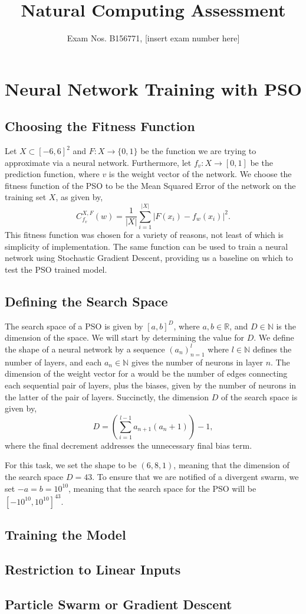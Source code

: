 \documentclass[12pt]{article}
\title{Natural Computing Assessment}
\author{Exam Nos. B156771, [insert exam number here]}
\begin{document}
\maketitle

\section{Neural Network Training with PSO}
\subsection{Choosing the Fitness Function}
Let $X \subset [-6,6]^2$ and $F:X\rightarrow \{0,1\}$ be the function we are trying to approximate via a neural network.
Furthermore, let $f_v:X\rightarrow [0,1]$ be the prediction function, where $v$ is the weight vector of the network.
We choose the fitness function of the PSO to be the Mean Squared Error of the network on the training set $X$, as given by,
\begin{equation}
    C_{f_v}^{X, F}(w) = \frac{1}{\left|X\right|}\sum_{i=1}^{\left|X\right|}\left|F(x_i) - f_w(x_i)\right|^2.
\end{equation}
This fitness function was chosen for a variety of reasons, not least of which is simplicity of implementation. 
The same function can be used to train a neural network using Stochastic Gradient Descent, providing us a baseline on which to test the PSO trained model. 
\subsection{Defining the Search Space}
The search space of a PSO is given by $[a,b]^D$, where $a,b\in \mathbb{R}$, and $D\in\mathbb{N}$ is the dimension of the space. 
We will start by determining the value for $D$.
We define the shape of a neural network by a sequence $(a_n)_{n=1}^{l}$ where $l\in\mathbb{N}$ defines the number of layers, and each $a_n \in \mathbb{N}$ gives the number of neurons in layer $n$. 
The dimension of the weight vector for a would be the number of edges connecting each sequential pair of layers, plus the biases, given by the number of neurons in the latter of the pair of layers. Succinctly, the dimension $D$ of the search space is given by,
\begin{equation}
    D = \left(\sum_{i=1}^{l-1} a_{n+1}\left(a_n + 1\right)\right) - 1,
\end{equation}
where the final decrement addresses the unnecessary final bias term.

For this task, we set the shape to be $(6, 8, 1)$, meaning that the dimension of the search space $D=43$. 
To ensure that we are notified of a divergent swarm, we set $-a=b=10^{10}$, meaning that the search space for the PSO will be $[-10^{10}, 10^{10}]^{43}$. 

\subsection{Training the Model}
\subsection{Restriction to Linear Inputs}
\subsection{Particle Swarm or Gradient Descent}
\end{document}
